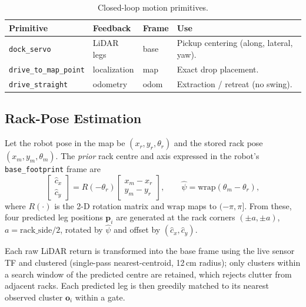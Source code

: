 \documentclass[11pt,a4paper]{article}
\newcommand{\code}[1]{\texttt{\small #1}}
\begin{document}
\begin{table}[h]\centering\small
\caption{Closed-loop motion primitives.}\label{tab:prims}
\begin{tabular}{@{}lll p{5.2cm}@{}}
\toprule
\textbf{Primitive} & \textbf{Feedback} & \textbf{Frame} & \textbf{Use}\\
\midrule
\code{dock\_servo} & LiDAR legs & base & Pickup centering (along, lateral, yaw).\\
\code{drive\_to\_map\_point} & localization & map & Exact drop placement.\\
\code{drive\_straight} & odometry & odom & Extraction / retreat (no swing).\\
\bottomrule
\end{tabular}
\end{table}

\subsection{Rack-Pose Estimation}\label{sec:estim}
Let the robot pose in the map be $(x_r,y_r,\theta_r)$ and the stored rack pose
$(x_m,y_m,\theta_m)$. The \emph{prior} rack centre and axis expressed in the
robot's \code{base\_footprint} frame are
\begin{equation}
\begin{bmatrix}\hat c_x\\ \hat c_y\end{bmatrix}=
R(-\theta_r)\begin{bmatrix}x_m-x_r\\ y_m-y_r\end{bmatrix},
\qquad \hat\psi=\mathrm{wrap}(\theta_m-\theta_r),
\end{equation}
where $R(\cdot)$ is the 2-D rotation matrix and $\mathrm{wrap}$ maps to
$(-\pi,\pi]$. From these, four predicted leg positions
$\mathbf p_i$ are generated at the rack corners $(\pm a,\pm a)$,
$a=\mathrm{rack\_side}/2$, rotated by $\hat\psi$ and offset by
$(\hat c_x,\hat c_y)$.

Each raw LiDAR return is transformed into the base frame using the live
sensor TF and clustered (single-pass nearest-centroid, 12\,cm radius); only
clusters within a search window of the predicted centre are retained, which
rejects clutter from adjacent racks. Each predicted leg is then greedily
matched to its nearest observed cluster $\mathbf o_i$ within a gate.
\end{document}
